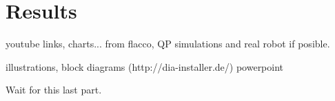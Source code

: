 \chapter{Results}
\label{resultschap}

youtube links, charts... from flacco, QP simulations and real robot if posible.

illustrations, block diagrams (http://dia-installer.de/) powerpoint

Wait for this last part.
